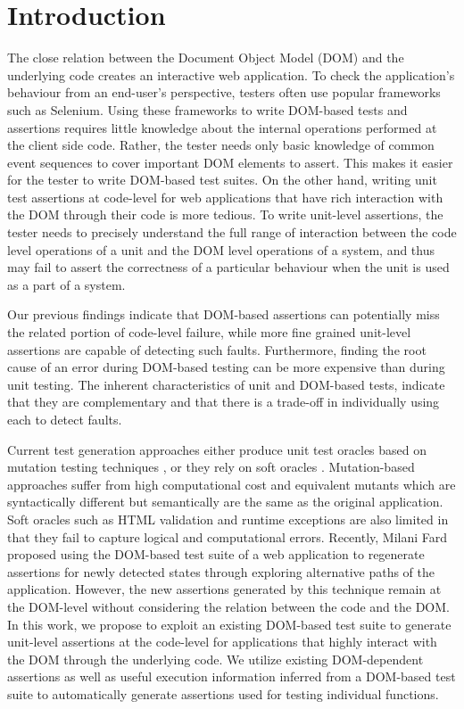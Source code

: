 \section{Introduction} \label{Sec:intro}
The close relation between the Document Object Model (DOM) and the underlying \javascript code creates an interactive web application. To check the application's behaviour from an end-user's perspective, testers often use popular frameworks such as Selenium. Using these frameworks to write DOM-based tests and assertions requires little knowledge about the internal operations performed at the client side code. Rather, the tester needs only basic knowledge of common event sequences to cover important DOM elements to assert. 
This makes it easier for the tester to write DOM-based test suites. On the other hand,
writing unit test assertions at code-level for web applications that have rich interaction with the DOM through their \javascript code is more tedious. 
To write unit-level assertions, the tester needs to precisely understand the full range of interaction between the code level operations of a unit and the DOM level operations of a system, and thus may fail to assert the correctness of a particular behaviour when the unit is used as a part of a system. 

Our previous findings \cite{mirshokraie:icst15} indicate that DOM-based assertions can potentially miss the related portion of
code-level failure, while more fine grained unit-level assertions are capable of detecting such faults. Furthermore, finding the root cause of an error during DOM-based testing can be more expensive than during unit testing.
The inherent characteristics of unit and DOM-based tests, indicate that they are complementary and that there is a trade-off in individually using each to detect faults. 

Current test generation approaches either produce unit test oracles based on mutation testing techniques \cite{mirshokraie:icst15, fraser:tse12}, or they rely on soft oracles \cite{artzi:icse11}. Mutation-based approaches suffer from high computational cost and equivalent mutants which are syntactically different but semantically are the same as the original application.
Soft oracles such as HTML validation and runtime exceptions are also limited in that they fail to capture logical and computational errors. 
Recently, Milani Fard \etal \cite{milanifard:ase14} proposed using the DOM-based test suite of a web application to regenerate assertions for newly detected states through exploring alternative paths of the application. However, the new assertions generated by this technique remain at the DOM-level without considering the relation between the \javascript code and the DOM.
In this work, we propose to exploit an existing DOM-based test suite to generate unit-level assertions at the code-level for applications that highly interact with the DOM through the underlying \javascript code. We utilize
existing DOM-dependent assertions as well as useful execution information inferred from a DOM-based test suite to automatically generate assertions used for testing individual \javascript functions.

